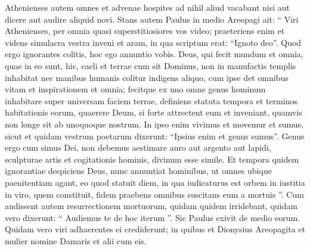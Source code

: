 \begin{biblechapter}
\begin{biblechapter}
\begin{biblechapter}
\begin{biblechapter}
\begin{biblechapter}
\begin{biblechapter}
\begin{biblechapter}
\begin{biblechapter}
\begin{biblechapter}
\begin{biblechapter}
\begin{biblechapter}
\begin{biblechapter}
\begin{biblechapter}
\begin{biblechapter}
\begin{biblechapter}
\begin{biblechapter}
\begin{biblechapter}
 \verse Athenienses autem omnes et advenae hospites ad nihil aliud vacabant nisi aut dicere aut audire aliquid novi.
 \verse Stans autem Paulus in medio Areopagi ait: “ Viri Athenienses, per omnia quasi superstitiosiores vos video; 
\verse praeteriens enim et videns simulacra vestra inveni et aram, in qua scriptum erat: “Ignoto deo”. Quod ergo ignorantes colitis, hoc ego annuntio vobis. 
\verse Deus, qui fecit mundum et omnia, quae in eo sunt, hic, caeli et terrae cum sit Dominus, non in manufactis templis inhabitat 
\verse nec manibus humanis colitur indigens aliquo, cum ipse det omnibus vitam et inspirationem et omnia; 
\verse fecitque ex uno omne genus hominum inhabitare super universam faciem terrae, definiens statuta tempora et terminos habitationis eorum, 
\verse quaerere Deum, si forte attrectent eum et inveniant, quamvis non longe sit ab unoquoque nostrum. 
\verse In ipso enim vivimus et movemur et sumus, sicut et quidam vestrum poetarum dixerunt:
 “Ipsius enim et genus sumus”.
 \verse Genus ergo cum simus Dei, non debemus aestimare auro aut argento aut lapidi, sculpturae artis et cogitationis hominis, divinum esse simile. 
\verse Et tempora quidem ignorantiae despiciens Deus, nunc annuntiat hominibus, ut omnes ubique paenitentiam agant, 
\verse eo quod statuit diem, in qua iudicaturus est orbem in iustitia in viro, quem constituit, fidem praebens omnibus suscitans eum a mortuis ”.
 \verse Cum audissent autem resurrectionem mortuorum, quidam quidem irridebant, quidam vero dixerunt: “ Audiemus te de hoc iterum ”. 
\verse Sic Paulus exivit de medio eorum. 
\verse Quidam vero viri adhaerentes ei crediderunt; in quibus et Dionysius Areopagita et mulier nomine Damaris et alii cum eis.
 

\end{biblechapter}
\end{biblechapter}
\end{biblechapter}
\end{biblechapter}
\end{biblechapter}
\end{biblechapter}
\end{biblechapter}
\end{biblechapter}
\end{biblechapter}
\end{biblechapter}
\end{biblechapter}
\end{biblechapter}
\end{biblechapter}
\end{biblechapter}
\end{biblechapter}
\end{biblechapter}
\end{biblechapter}
